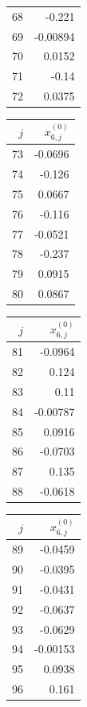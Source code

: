 {\begin{tabular}[t]{r|r}
68 & -0.221 \\
69 & -0.00894 \\
70 & 0.0152 \\
71 & -0.14 \\
72 & 0.0375
\end{tabular}\kern4pt
\begin{tabular}[t]{r|r}
$j$ & $x^{(0)}_{6,j}$ \\\hline
73 & -0.0696 \\
74 & -0.126 \\
75 & 0.0667 \\
76 & -0.116 \\
77 & -0.0521 \\
78 & -0.237 \\
79 & 0.0915 \\
80 & 0.0867
\end{tabular}\kern4pt
\begin{tabular}[t]{r|r}
$j$ & $x^{(0)}_{6,j}$ \\\hline
81 & -0.0964 \\
82 & 0.124 \\
83 & 0.11 \\
84 & -0.00787 \\
85 & 0.0916 \\
86 & -0.0703 \\
87 & 0.135 \\
88 & -0.0618
\end{tabular}\kern4pt
\begin{tabular}[t]{r|r}
$j$ & $x^{(0)}_{6,j}$ \\\hline
89 & -0.0459 \\
90 & -0.0395 \\
91 & -0.0431 \\
92 & -0.0637 \\
93 & -0.0629 \\
94 & -0.00153 \\
95 & 0.0938 \\
96 & 0.161
\end{tabular}}

